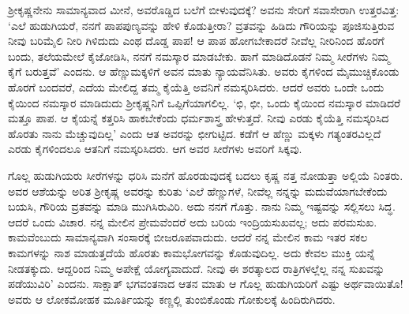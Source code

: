 ಶ್ರೀಕೃಷ್ಣನೇನು ಸಾಮಾನ್ಯವಾದ ಮೀನೆ, ಅವರೊಡ್ಡಿದ ಬಲೆಗೆ ಬೀಳುವುದಕ್ಕೆ? ಅವನು ಸೇರಿಗೆ ಸವಾಸೇರಾಗಿ ಉತ್ತರವಿತ್ತ: ‘ಎಲೆ ಹುಡುಗಿಯರೆ, ನನಗೆ ಪಾಪಪುಣ್ಯವನ್ನು ಹೇಳಿ ಕೊಡುತ್ತೀರಾ? ವ್ರತವನ್ನು ಹಿಡಿದು ಗೌರಿಯನ್ನು ಪೂಜಿಸುತ್ತಿರುವ ನೀವು ಬರಿಮೈಲಿ ನೀರಿ ಗಿಳಿದುದು ಎಂಥ ದೊಡ್ಡ ಪಾಪ! ಆ ಪಾಪ ಹೋಗಬೇಕಾದರೆ ನೀವೆಲ್ಲ ನೀರಿನಿಂದ ಹೊರಗೆ ಬಂದು, ತಲೆಯಮೇಲೆ ಕೈಜೋಡಿಸಿ, ನನಗೆ ನಮಸ್ಕಾರ ಮಾಡಬೇಕು. ಹಾಗೆ ಮಾಡಿದೊಡನೆ ನಿಮ್ಮ ಸೀರೆಗಳು ನಿಮ್ಮ ಕೈಗೆ ಬರುತ್ತವೆ’ ಎಂದನು. ಆ ಹೆಣ್ಣುಮಕ್ಕಳಿಗೆ ಅವನ ಮಾತು ನ್ಯಾಯವೆನಿಸಿತು. ಅವರು ಕೈಗಳಿಂದ ಮೈಮುಚ್ಚಿಕೊಂಡು ಹೊರಗೆ ಬಂದವರೆ, ಎದೆಯ ಮೇಲಿದ್ದ ತಮ್ಮ ಕೈಯೆತ್ತಿ ಅವನಿಗೆ ನಮಸ್ಕರಿಸಿದರು. ಆದರೆ ಅವರು ಒಂದೇ ಒಂದು ಕೈಯಿಂದ ನಮಸ್ಕಾರ ಮಾಡಿದುದು ಶ್ರೀಕೃಷ್ಣನಿಗೆ ಒಪ್ಪಿಗೆಯಾಗಲಿಲ್ಲ. ‘ಛಿ, ಛೀ, ಒಂದು ಕೈಯಿಂದ ನಮಸ್ಕಾರ ಮಾಡಿದರೆ ಮತ್ತೂ ಪಾಪ. ಆ ಕೈಯನ್ನೆ ಕತ್ತರಿಸಿ ಹಾಕಬೇಕೆಂದು ಧರ್ಮಶಾಸ್ತ್ರ ಹೇಳುತ್ತದೆ. ನೀವು ಎರಡು ಕೈಯೆತ್ತಿ ನಮಸ್ಕರಿಸಿದ ಹೊರತು ನಾನು ಮೆಚ್ಚುವುದಿಲ್ಲ’ ಎಂದು ಆತ ಅವರನ್ನು ಛೀಗುಟ್ಟಿದ. ಕಡೆಗೆ ಆ ಹೆಣ್ಣು ಮಕ್ಕಳು ಗತ್ಯಂತರವಿಲ್ಲದೆ ಎರಡು ಕೈಗಳಿಂದಲೂ ಆತನಿಗೆ ನಮಸ್ಕರಿಸಿದರು. ಆಗ ಅವರ ಸೀರೆಗಳು ಅವರಿಗೆ ಸಿಕ್ಕವು.

ಗೊಲ್ಲ ಹುಡುಗಿಯರು ಸೀರೆಗಳನ್ನು ಧರಿಸಿ ಮನೆಗೆ ಹೊರಡುವುದಕ್ಕೆ ಬದಲು ಕೃಷ್ಣ ನತ್ತ ನೋಡುತ್ತಾ ಅಲ್ಲಿಯೆ ನಿಂತರು. ಅವರ ಆಶೆಯನ್ನು ಅರಿತ ಶ್ರೀಕೃಷ್ಣ ಅವರನ್ನು ಕುರಿತು ‘ಎಲೆ ಹೆಣ್ಣುಗಳೆ, ನೀವೆಲ್ಲ ನನ್ನನ್ನು ಮದುವೆಯಾಗಬೇಕೆಂದು ಬಯಸಿ, ಗೌರಿಯ ವ್ರತವನ್ನು ಮಾಡಿ ಮುಗಿಸಿರುವಿರಿ. ಅದು ನನಗೆ ಗೊತ್ತು. ನಾನು ನಿಮ್ಮ ಇಷ್ಟವನ್ನು ಸಲ್ಲಿಸಲು ಸಿದ್ಧ. ಆದರೆ ಒಂದು ವಿಚಾರ. ನನ್ನ ಮೇಲಿನ ಪ್ರೇಮವೆಂದರೆ ಅದು ಬರಿಯ ಇಂದ್ರಿಯಸುಖವಲ್ಲ; ಅದು ಪರಮಸುಖ. ಕಾಮವೆಂಬುದು ಸಾಮಾನ್ಯವಾಗಿ ಸಂಸಾರಕ್ಕೆ ಬೀಜರೂಪವಾದುದು. ಆದರೆ ನನ್ನ ಮೇಲಿನ ಕಾಮ ಇತರ ಸಕಲ ಕಾಮಗಳನ್ನು ನಾಶ ಮಾಡುತ್ತದೆಯೆ ಹೊರತು ಕಾಮಭೋಗವನ್ನು ಕೊಡುವುದಿಲ್ಲ. ಅದು ಕೇವಲ ಮುಕ್ತಿ ಯನ್ನೆ ನೀಡತಕ್ಕುದು. ಆದ್ದರಿಂದ ನಿಮ್ಮ ಅಪೇಕ್ಷೆ ಯೋಗ್ಯವಾದುದೆ. ನೀವು ಈ ಶರತ್ಕಾಲದ ರಾತ್ರಿಗಳಲ್ಲೆಲ್ಲ ನನ್ನ ಸುಖವನ್ನು ಪಡೆಯುವಿರಿ’ ಎಂದನು. ಸಾಕ್ಷಾತ್ ಭಗವಂತನಾದ ಆತನ ಮಾತು ಆ ಗೊಲ್ಲ ಹುಡುಗಿಯರಿಗೆ ಎಷ್ಟು ಅರ್ಥವಾಯಿತೊ! ಅವರು ಆ ಲೋಕಮೋಹಕ ಮೂರ್ತಿಯನ್ನು ಕಣ್ಣಲ್ಲಿ ತುಂಬಿಕೊಂಡು ಗೋಕುಲಕ್ಕೆ ಹಿಂದಿರುಗಿದರು.

